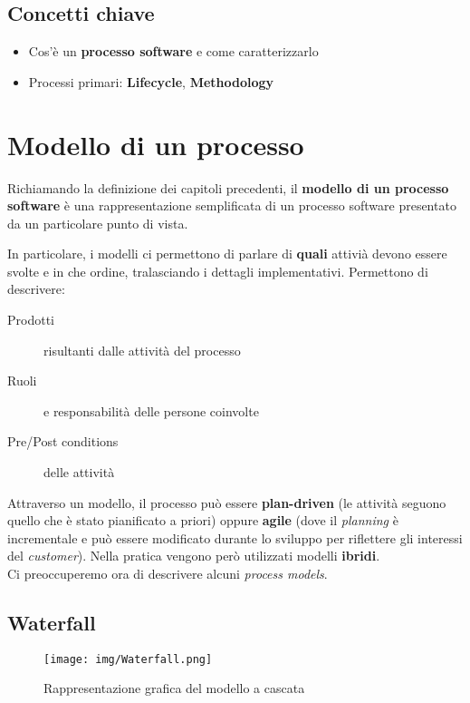 \subsection{Concetti chiave}

\begin{itemize}
    \item Cos'\`e un \textbf{processo software} e come caratterizzarlo
    \item Processi primari: \textbf{Lifecycle}, \textbf{Methodology}
\end{itemize}

\section{Modello di un processo}

Richiamando la definizione dei capitoli precedenti, il
\textbf{modello di un processo software} \`e una rappresentazione semplificata
di un processo software presentato da un particolare punto di vista.

In particolare, i modelli ci permettono di parlare di \textbf{quali}
attivi\`a devono essere svolte e in che ordine, tralasciando i dettagli
implementativi. Permettono di descrivere:
\begin{description}
    \item[Prodotti] risultanti dalle attivit\`a del processo
    \item[Ruoli] e responsabilit\`a delle persone coinvolte
    \item[Pre/Post conditions] delle attivit\`a
\end{description}

Attraverso un modello, il processo pu\`o essere \textbf{plan-driven}
(le attivit\`a seguono quello che \`e stato pianificato a priori)
oppure \textbf{agile} (dove il \textit{planning} \`e incrementale
e pu\`o essere modificato durante lo sviluppo per riflettere gli
interessi del \textit{customer}). Nella pratica vengono per\`o utilizzati
modelli \textbf{ibridi}.\\

Ci preoccuperemo ora di descrivere alcuni \textit{process models}.
\newpage

\subsection{Waterfall}

\begin{figure}[H]
    \centering
    \texttt{[image: img/Waterfall.png]}
    \caption*{Rappresentazione grafica del modello a cascata}
\end{figure}

